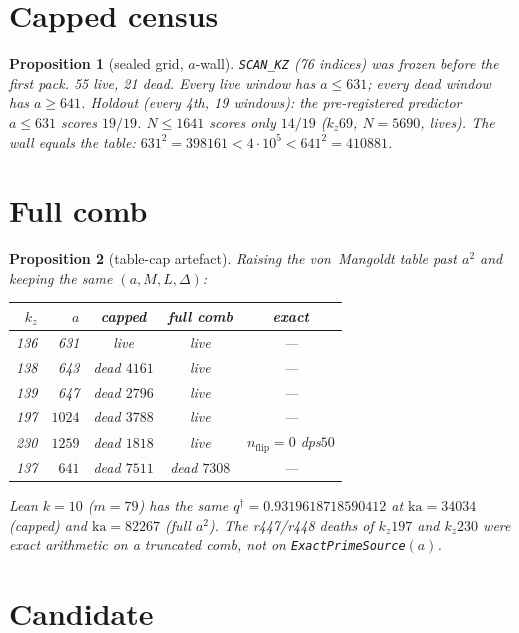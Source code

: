 \documentclass[11pt]{article}
\newtheorem{prop}{Proposition}
\begin{document}
\section{Capped census}\label{sec:B}

\begin{prop}[sealed grid, $a$-wall]\label{prop:wall}
\texttt{SCAN\_KZ} (76 indices) was frozen
before the first pack.
55 live, 21 dead.
Every live window has $a\le 631$;
every dead window has $a\ge 641$.
Holdout (every 4th, 19 windows):
the pre-registered predictor $a\le 631$
scores $19/19$.
$N\le 1641$ scores only $14/19$
($k_z69$, $N=5690$, lives).
The wall equals the table:
$631^{2}=398161<4\cdot10^{5}<641^{2}=410881$.
\end{prop}

\section{Full comb}\label{sec:full}

\begin{prop}[table-cap artefact]\label{prop:cap}
Raising the von~Mangoldt table past $a^{2}$
and keeping the same $(a,M,L,\Delta)$:
\begin{center}
\small
\begin{tabular}{@{}rrccc@{}}
\toprule
$k_z$ & $a$ & capped & full comb & exact \\
\midrule
136 & 631 & live & live & --- \\
138 & 643 & dead $4161$ & live & --- \\
139 & 647 & dead $2796$ & live & --- \\
197 & $1024$ & dead $3788$ & live & --- \\
230 & $1259$ & dead $1818$ & live & $n_{\mathrm{flip}}=0$ dps$50$ \\
137 & $641$ & dead $7511$ & dead $7308$ & --- \\
\bottomrule
\end{tabular}
\end{center}
Lean $k=10$ ($m=79$) has the same
$q^{\dagger}=0.9319618718590412$ at
$\mathrm{ka}=34034$ (capped) and
$\mathrm{ka}=82267$ (full $a^{2}$).
The r447/r448 deaths of $k_z197$ and
$k_z230$ were exact arithmetic on a
truncated comb, not on
\texttt{ExactPrimeSource}$(a)$.
\end{prop}

\section{Candidate}\label{sec:C}
\end{document}
